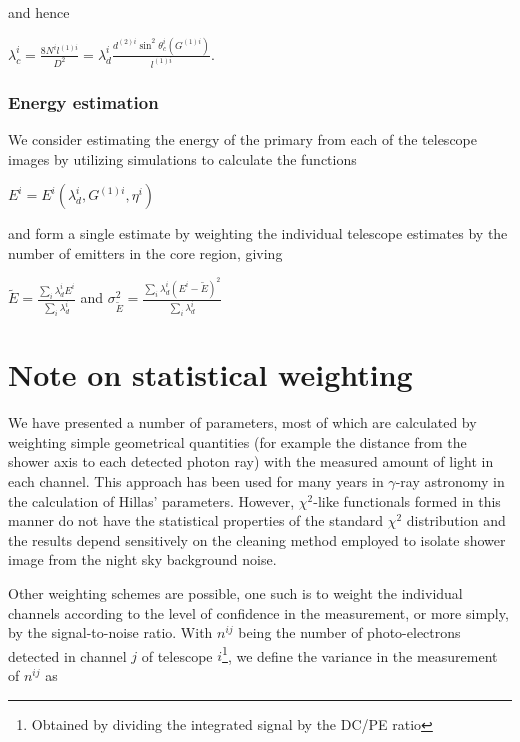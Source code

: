 \documentclass[letterpaper]{article}
\begin{document}
and hence 

$\displaystyle \lambda_c^i = \frac{8N^il^{(1)i}}{D^2}
= \lambda_d^i \frac{d^{(2)i} \sin^2\theta_c^i(G^{(1)i})}{l^{(1)i}}$.

\subsubsection*{Energy estimation}

We consider estimating the energy of the primary from each of the 
telescope images by utilizing simulations to calculate the functions

$\displaystyle E^i = E^i\left(\lambda_d^i,G^{(1)i},\eta^i\right)$

and form a single estimate by weighting the individual telescope
estimates by the number of emitters in the core region, giving

$\displaystyle \tilde{E} = 
\frac{\sum\limits_i \lambda_d^i E^i}{\sum\limits_i \lambda_d^i}$ and
$\displaystyle \sigma_{\tilde{E}}^2 
= \frac{\sum\limits_i \lambda_d^i (E^i - \tilde{E})^2}
{\sum\limits_i \lambda_d^i}$


%
%

\section{Note on statistical weighting}

We have presented a number of parameters, most of which are calculated
by weighting simple geometrical quantities (for example the distance
from the shower axis to each detected photon ray) with the measured
amount of light in each channel. This approach has been used for many
years in $\gamma$-ray astronomy in the calculation of Hillas'
parameters. However, $\chi^2$-like functionals formed in this manner
do not have the statistical properties of the standard $\chi^2$
distribution and the results depend sensitively on the cleaning method 
employed to isolate shower image from the night sky background noise. 

Other weighting schemes are possible, one such is to weight the
individual channels according to the level of confidence in the
measurement, or more simply, by the signal-to-noise ratio. With
$n^{ij}$ being the number of photo-electrons detected in channel $j$
of telescope $i$\footnote{Obtained by dividing the integrated signal
by the DC/PE ratio}, we define the variance in the measurement of
$n^{ij}$ as
\end{document}
